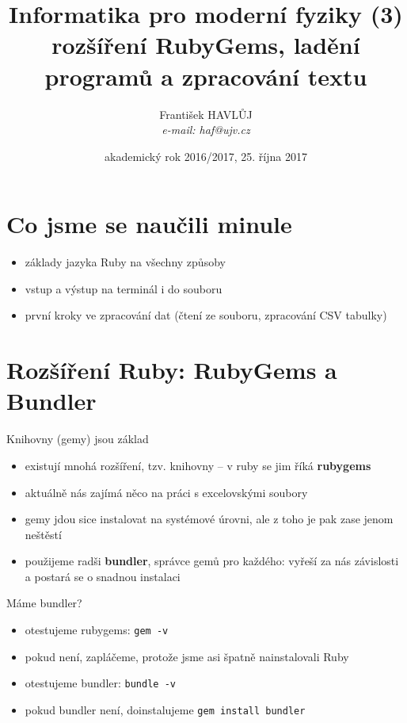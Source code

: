 \documentclass{beamer}
\title[IMF (3)]{Informatika pro moderní fyziky (3)\\rozšíření RubyGems, ladění programů a zpracování textu}
\author[Franti\v{s}ek HAVL\r{U}J, ORF ÚJV Řež]{Franti\v{s}ek HAVL\r{U}J\\{\scriptsize \emph{e-mail: haf@ujv.cz}}}
\date{akademický rok 2016/2017, 25. října 2017}
\institute[ORF ÚJV Řež]
{ÚJV Řež\\oddělení Reaktorové fyziky a podpory palivového cyklu}
\begin{document}
\begin{frame}
  \titlepage
\end{frame}

\begin{frame}
  \tableofcontents
\end{frame}

\section{Co jsme se naučili minule}

\begin{frame}{}
  \begin{itemize}
    \item základy jazyka Ruby na všechny způsoby
    \item vstup a výstup na terminál i do souboru
    \item první kroky ve zpracování dat (čtení ze souboru, zpracování CSV tabulky)
  \end{itemize}
\end{frame}
\section{Rozšíření Ruby: RubyGems a Bundler}

\begin{frame}{Knihovny (gemy) jsou základ}
  \begin{itemize}
    \item existují mnohá rozšíření, tzv. knihovny -- v ruby se jim říká \textbf{rubygems}
    \item aktuálně nás zajímá něco na práci s excelovskými soubory
    \item gemy jdou sice instalovat na systémové úrovni, ale z toho je pak zase jenom neštěstí
    \item použijeme radši \textbf{bundler}, správce gemů pro každého: vyřeší za nás závislosti a postará se o snadnou instalaci
  \end{itemize}
\end{frame}

\begin{frame}{Máme bundler?}
  \begin{itemize}
    \item otestujeme rubygems: \texttt{gem -v}
    \item pokud není, zapláčeme, protože jsme asi špatně nainstalovali Ruby
    \item otestujeme bundler: \texttt{bundle -v}
    \item pokud bundler není, doinstalujeme \texttt{gem install bundler}
  \end{itemize}
\end{frame}
\end{document}
